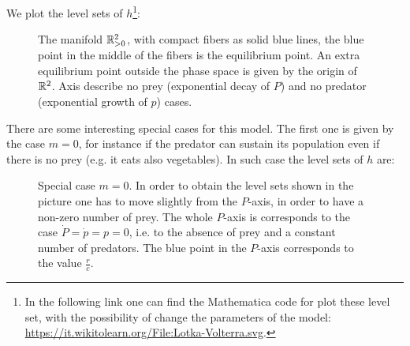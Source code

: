 \documentclass[main.tex]{subfiles}
\begin{document}
\begin{example}
	We plot the level sets of $h$\footnote{In the following link one can find the Mathematica code for plot these level set, with the possibility of change the parameters of the model: \url{https://it.wikitolearn.org/File:Lotka-Volterra.svg}.}:
	
	\begin{figure}[H]
		\centering
		\caption{The manifold $\mathbb{R}^2_{>0}$, with compact fibers as solid blue lines, the blue point in the middle of the fibers is the equilibrium point. An extra equilibrium point outside the phase space is given by the origin of $\mathbb{R}^2$. Axis describe no prey (exponential decay of $P$) and no predator (exponential growth of $p$) cases.}
		\label{fig:Lotka_Volterra_diagram}
	\end{figure}
	
	There are some interesting special cases for this model. The first one is given by the case $m=0$, for instance if the predator can sustain its population even if there is no prey (e.g. it eats also vegetables). In such case the level sets of $h$ are:
	
	\begin{figure}[H]
		\centering
		\caption{Special case $m=0$. In order to obtain the level sets shown in the picture one has to move slightly from the $P$-axis, in order to have a non-zero number of prey. The whole $P$-axis is corresponds to the case $\dot P = \dot p = p =0$, i.e. to the absence of prey and a constant number of predators. The blue point in the $P$-axis corresponds to the value $\frac{r}{c}$.}
		\label{fig:SIR_diagram}
	\end{figure}
	

\end{example}
\end{document}
